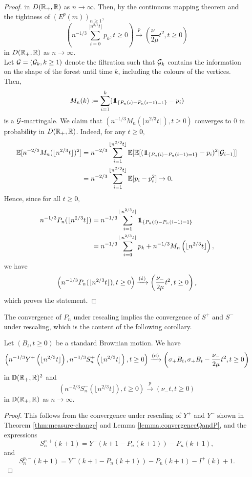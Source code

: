 \begin{proof}
in $D({\mathbb R}_+,{\mathbb R})$ as $n\to \infty$. 
Then, by the continuous mapping theorem and the tightness of $(E^p(m))_{n\geq 1}$,
$$\left(n^{-1/3}\sum_{i=0}^{\lfloor n^{2/3}t \rfloor} p_k , t \geq 0\right)\overset{p}{\to} \left(\frac{\nu_-}{2\mu}t^2,t\geq 0\right)$$
in $D({\mathbb R}_+,{\mathbb R})$ as $n\to \infty$. \\
Let ${\mathcal G}=({\mathcal G}_k,k\geq 1)$ denote the filtration such that ${\mathcal G}_{k}$ contains the information on the shape of the forest until time $k$, including the colours of the vertices. Then, 
$$M_n(k):=\sum_{i=1}^k (\one_{\{P_n(i)-P_n(i-1)=1\}}-p_i)$$ is a ${\mathcal G}$-martingale. We claim that $(n^{-1/3}M_n(\lfloor n^{2/3} t\rfloor ), t\geq 0)$ converges to $0$ in probability in $D({\mathbb R}_+,{\mathbb R})$. Indeed, for any $t\geq 0$,
\begin{align*}\E[n^{-2/3}M_n(\lfloor n^{2/3} t\rfloor )^2]&=n^{-2/3}\sum_{i=1}^{\lfloor n^{2/3} t\rfloor} \E[\E[(\one_{\{P_n(i)-P_n(i-1)=1\}}-p_i)^2|\cG_{i-1}]]\\&=n^{-2/3}\sum_{i=1}^{\lfloor n^{2/3} t\rfloor} \E[p_i-p_i^2]\to 0.\end{align*}
Hence, since for all $t\geq 0$,
\begin{align*}n^{-1/3}P_n(\lfloor n^{2/3}t\rfloor)&=n^{-1/3}\sum_{i=1}^{\lfloor n^{2/3}t\rfloor}  \one_{\{P_n(i)-P_n(i-1)=1\}}\\
&= n^{-1/3}\sum_{i=0}^{\lfloor n^{2/3}t \rfloor} p_k + n^{-1/3} M_n\left(\lfloor n^{2/3}t\rfloor\right),
\end{align*}
we have
$$\left(n^{-1/3}P_n(\lfloor n^{2/3}t\rfloor),t\geq 0\right)\xrightarrow[]{\mathrm{(d)}}  \left( \frac{\nu_-}{2\mu}t^2, t\geq 0 \right),$$
 which proves the statement.

\end{proof}

The convergence of $P_n$ under rescaling implies the convergence of $S^{+}$ and $S^{-}$ under rescaling, which is the content of the following corollary. 

\begin{corollary}\label{cor.lukasiewiczpathpurplevertices}
 Let $(B_t,t\geq 0)$ be a standard Brownian motion. We have 
 \begin{align*}\left(n^{-1/3}Y^{+}\left(\lfloor n^{2/3}t\rfloor\right), n^{-1/3}S^{+}_n\left(\lfloor n^{2/3}t\rfloor\right), t\geq 0\right)\xrightarrow[]{\mathrm{(d)}}\left(\sigma_+B_t,\sigma_+B_t-\frac{\nu_-}{2\mu}t^2,  t\geq 0\right)\end{align*}
 in ${\mathbb D}({\mathbb R}_+,{\mathbb R})^2$  and 
 $$\left(n^{-2/3}S^{-}_n\left(\lfloor n^{2/3}t\rfloor\right),t\geq 0\right)\overset{p}{\to}\left(\nu_- t,t\geq 0\right)$$
 in ${\mathbb D}({\mathbb R}_+,{\mathbb R})$ as $n\to\infty$.
\end{corollary}
\begin{proof}
 This follows from the convergence under rescaling of $Y^+$ and $Y^-$ shown in Theorem \ref{thm:measure-change} and Lemma \ref{lemma.convergenceQandP}, and the expressions 
 $$S_n^{p,+}(k+1)=Y^+\left(k+1-P_n(k+1)\right)-P_n(k+1),$$ and $$S_n^{p,-}(k+1)=Y^-\left(k+1-P_n(k+1)\right)-P_n(k+1)-I^{+}(k)+1.$$
\end{proof}

